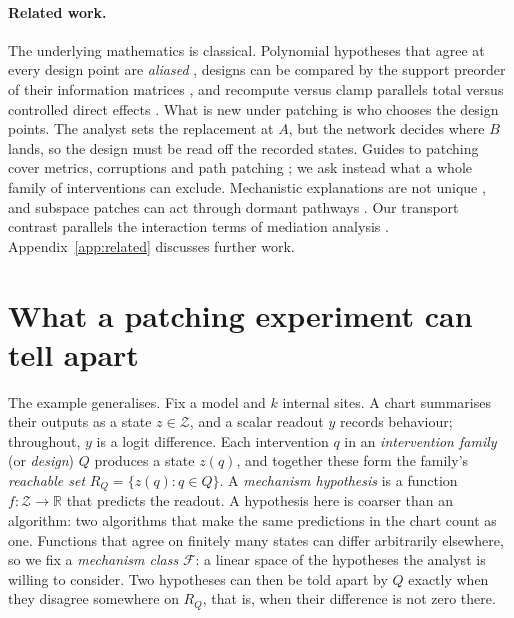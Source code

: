 \documentclass{article}
\theoremstyle{plain}
\theoremstyle{definition}
\begin{document}
\paragraph{Related work.} The underlying mathematics is classical. Polynomial hypotheses that agree at every design point are
\emph{aliased} \citep{pistone1996groebner}, designs can be compared by the support preorder of their information
matrices \citep{pukelsheim2006optimal}, and recompute versus clamp parallels total versus controlled direct effects
\citep{pearl2001direct}. What is new under patching is who chooses the design points. The analyst sets the replacement
at $A$, but the network decides where $B$ lands, so the design must be read off the recorded states. Guides to patching
cover metrics, corruptions and path patching
\citep{zhang2024patching,heimersheim2024patching,goldowskydill2023pathpatching}; we ask instead what a whole family of
interventions can exclude. Mechanistic explanations are not unique \citep{meloux2025everything}, and subspace patches can
act through dormant pathways \citep{makelov2024illusion}. Our transport contrast
parallels the interaction terms of mediation analysis \citep{vanderweele2014fourway}. Appendix~\ref{app:related}
discusses further work.

\section{What a patching experiment can tell apart}
\label{sec:setup}

The example generalises. Fix a model and $k$ internal sites. A chart summarises their outputs as a state
$z\in\mathcal Z$, and a scalar readout $y$ records behaviour; throughout, $y$ is a logit difference. Each intervention
$q$ in an \emph{intervention family} (or \emph{design}) $Q$ produces a state $z(q)$, and together these form the family's \emph{reachable
set} $R_Q=\{z(q):q\in Q\}$.  A \emph{mechanism hypothesis} is a function $f:\mathcal Z\to\mathbb R$ that predicts the
readout. A hypothesis here is coarser than an algorithm: two algorithms that make the same predictions in the chart count as one. Functions that agree on finitely many states can differ arbitrarily elsewhere, so we fix a \emph{mechanism
class} $\mathcal F$: a linear space of the hypotheses the analyst is willing to consider. Two hypotheses can then be
told apart by $Q$ exactly when they disagree somewhere on $R_Q$, that is, when their difference is not zero there.
\end{document}
